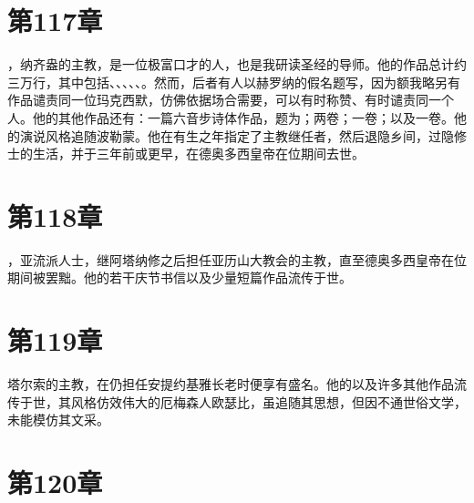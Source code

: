 
\section{第117章}

，纳齐盎的主教，是一位极富口才的人，也是我研读圣经的导师。他的作品总计约三万行，其中包括、、、、、。然而，后者有人以赫罗纳的假名题写，因为额我略另有作品谴责同一位玛克西默，仿佛依据场合需要，可以有时称赞、有时谴责同一个人。他的其他作品还有：一篇六音步诗体作品，题为；两卷；一卷；以及一卷。他的演说风格追随波勒蒙。他在有生之年指定了主教继任者，然后退隐乡间，过隐修士的生活，并于三年前或更早，在德奥多西皇帝在位期间去世。\par


\section{第118章}

，亚流派人士，继阿塔纳修之后担任亚历山大教会的主教，直至德奥多西皇帝在位期间被罢黜。他的若干庆节书信以及少量短篇作品流传于世。\par


\section{第119章}

塔尔索的主教，在仍担任安提约基雅长老时便享有盛名。他的以及许多其他作品流传于世，其风格仿效伟大的厄梅森人欧瑟比，虽追随其思想，但因不通世俗文学，未能模仿其文采。\par


\section{第120章}

